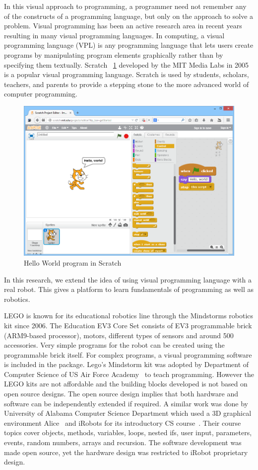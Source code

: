 In this visual approach to programming, a programmer need not remember any of the constructs of a programming language, but only on the approach to solve a problem. Visual programming has been an active research area in recent years resulting in many visual programming languages. In computing, a visual programming language (VPL) is any programming language that lets users create programs by manipulating program elements graphically rather than by specifying them textually. Scratch ~\ref{fig:scratch} developed by the MIT Media Labs in 2005 is a popular visual programming language. Scratch is used by students, scholars, teachers, and parents to provide a stepping stone to the more advanced world of computer programming.

\begin{figure}[h]
\centering
\includegraphics[width=1\columnwidth]{Images/scratch}
\caption{Hello World program in Scratch}
\label{fig:scratch}
\end{figure}

In this research, we extend the idea of using visual programming language with a real robot. This gives a platform to learn fundamentals of programming as well as robotics. 

LEGO is known for its educational robotics line through the Mindstorms robotics kit since 2006. The Education EV3 Core Set consists of EV3 programmable brick (ARM9-based processor), motors, different types of sensors and around 500 accessories. Very simple programs for the robot can be created using the programmable brick itself. For complex programs, a visual programming software is included in the package. Lego's Mindstorm kit was adopted by Department of Computer Science of US Air Force Academy~\cite{lego} to teach programming. However the LEGO kits are not affordable and the building blocks developed is not based on open source designs. The open source design implies that both hardware and software can be independently
extended if required. A similar work was done by University of Alabama Computer Science 
Department which used a 3D graphical environment Alice~\cite{alice} and iRobots for its introductory CS course~\cite{irobot}. Their course topics cover objects, methods, variables, loops, nested ifs, user input, parameters, events, random numbers, arrays and recursion. The software development was made open source, yet the hardware design was restricted
to iRobot proprietary design.


